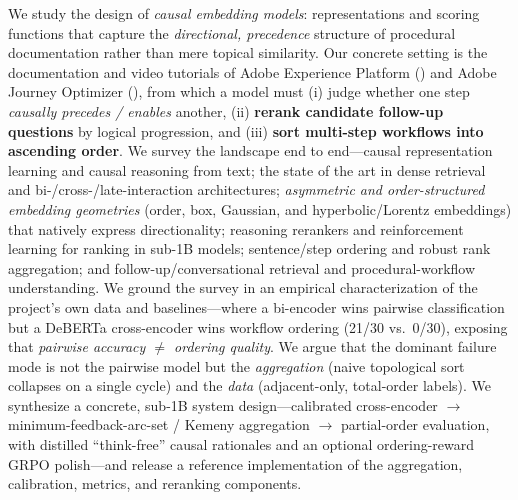We study the design of \emph{causal embedding models}: representations and scoring
functions that capture the \emph{directional, precedence} structure of procedural
documentation rather than mere topical similarity. Our concrete setting is the
documentation and video tutorials of Adobe Experience Platform (\aep) and Adobe
Journey Optimizer (\ajo), from which a model must (i) judge whether one step
\emph{causally precedes / enables} another, (ii) \textbf{rerank candidate follow-up
questions} by logical progression, and (iii) \textbf{sort multi-step workflows into
ascending order}. We survey the landscape end to end---causal representation learning
and causal reasoning from text; the state of the art in dense retrieval and
bi-/cross-/late-interaction architectures; \emph{asymmetric and order-structured
embedding geometries} (order, box, Gaussian, and hyperbolic/Lorentz embeddings) that
natively express directionality; reasoning rerankers and reinforcement learning for
ranking in sub-1B models; sentence/step ordering and robust rank aggregation; and
follow-up/conversational retrieval and procedural-workflow understanding. We ground the
survey in an empirical characterization of the project's own data and baselines---where
a bi-encoder wins pairwise classification but a DeBERTa cross-encoder wins workflow
ordering (21/30 vs.\ 0/30), exposing that \emph{pairwise accuracy $\neq$ ordering
quality}. We argue that the dominant failure mode is not the pairwise model but the
\emph{aggregation} (naive topological sort collapses on a single cycle) and the
\emph{data} (adjacent-only, total-order labels). We synthesize a concrete, sub-1B system
design---calibrated cross-encoder $\rightarrow$ minimum-feedback-arc-set / Kemeny
aggregation $\rightarrow$ partial-order evaluation, with distilled ``think-free'' causal
rationales and an optional ordering-reward GRPO polish---and release a reference
implementation of the aggregation, calibration, metrics, and reranking components.
